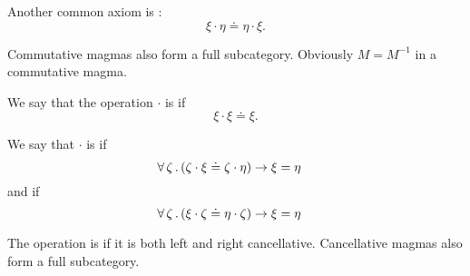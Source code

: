 \begin{definition}
\begin{thmenum}[resume=def:magma]
     Another common axiom is :
    \begin{equation}\label{eq:def:magma/commutative}
      \xi \cdot \eta \doteq \eta \cdot \xi.
    \end{equation}

    Commutative magmas also form a full subcategory. Obviously \( M = M^{-1} \) in a commutative magma.

     We say that the operation \( \cdot \) is  if
    \begin{equation}\label{eq:def:magma/idempotent}
      \xi \cdot \xi \doteq \xi.
    \end{equation}

     We say that \( \cdot \) is  if
    \begin{equation}\label{eq:def:magma/cancellative/left}
      \forall \thinspace \zeta \thinspace . \thinspace (\zeta \cdot \xi \doteq \zeta \cdot \eta) \rightarrow \xi = \eta
      \quad
    \end{equation}
    and  if
    \begin{equation}\label{eq:def:magma/cancellative/right}
      \forall \thinspace \zeta \thinspace . \thinspace (\xi \cdot \zeta \doteq \eta \cdot \zeta) \rightarrow \xi = \eta
      \quad
    \end{equation}

    The operation is  if it is both left and right cancellative. Cancellative magmas also form a full subcategory.
  \end{thmenum}
\end{definition}

